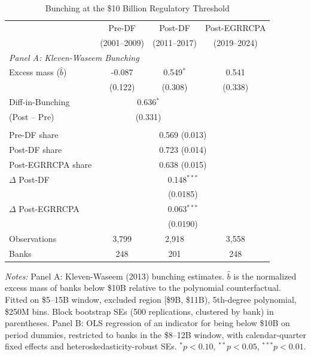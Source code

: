 \begin{table}[htbp]
\centering
\begin{threeparttable}
\caption{Bunching at the \$10 Billion Regulatory Threshold}
\label{tab:bunching}
\begin{tabular}{lccc}
\toprule
 & Pre-DF & Post-DF & Post-EGRRCPA \\
 & (2001--2009) & (2011--2017) & (2019--2024) \\
\midrule
\multicolumn{4}{l}{\textit{Panel A: Kleven-Waseem Bunching}} \\
\addlinespace
Excess mass ($\hat{b}$) & -0.087 & 0.549$^{*}$ & 0.541 \\
 & (0.122) & (0.308) & (0.338) \\
\addlinespace
Diff-in-Bunching & \multicolumn{2}{c}{0.636$^{*}$} & \\
(Post -- Pre) & \multicolumn{2}{c}{(0.331)} & \\
\addlinespace
\midrule
\multicolumn{4}{l}{\textit{Panel B: Share Below \$10B in \$8--12B Window}} \\
\addlinespace
Pre-DF share & \multicolumn{3}{c}{0.569 (0.013)} \\
Post-DF share & \multicolumn{3}{c}{0.723 (0.014)} \\
Post-EGRRCPA share & \multicolumn{3}{c}{0.638 (0.015)} \\
\addlinespace
$\Delta$ Post-DF & \multicolumn{3}{c}{0.148$^{***}$} \\
 & \multicolumn{3}{c}{(0.0185)} \\
$\Delta$ Post-EGRRCPA & \multicolumn{3}{c}{0.063$^{***}$} \\
 & \multicolumn{3}{c}{(0.0190)} \\
\addlinespace
\midrule
Observations & 3,799 & 2,918 & 3,558 \\
Banks & 248 & 201 & 248 \\
\bottomrule
\end{tabular}
\begin{tablenotes}[flushleft]
\small
\item \textit{Notes:} Panel A: Kleven-Waseem (2013) bunching estimates. $\hat{b}$ is the normalized excess mass of banks below \$10B relative to the polynomial counterfactual. Fitted on \$5--15B window, excluded region [\$9B, \$11B), 5th-degree polynomial, \$250M bins. Block bootstrap SEs (500 replications, clustered by bank) in parentheses. Panel B: OLS regression of an indicator for being below \$10B on period dummies, restricted to banks in the \$8--12B window, with calendar-quarter fixed effects and heteroskedasticity-robust SEs. $^{*}p<0.10$, $^{**}p<0.05$, $^{***}p<0.01$.
\end{tablenotes}
\end{threeparttable}
\end{table}
